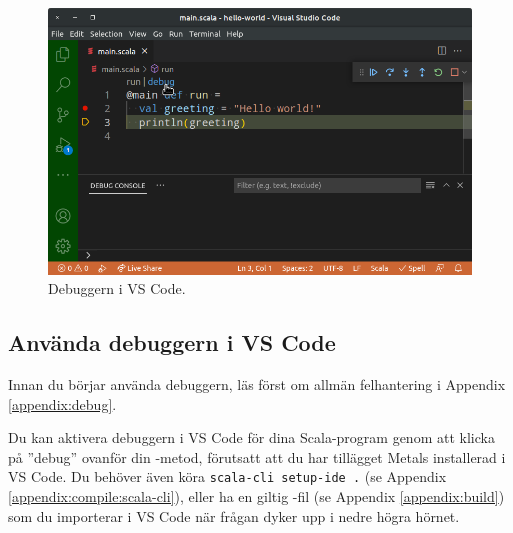 \begin{figure}
\centering
\includegraphics[width=1.0\textwidth]{../img/vscode-debug}
\caption{Debuggern i VS Code.\label{appendix-ide:vscode-debug}}
\end{figure}

\subsection{Använda debuggern i VS Code}

Innan du börjar använda debuggern, läs först om allmän felhantering i Appendix \ref{appendix:debug}.

Du kan aktivera debuggern i VS Code för dina Scala-program genom att klicka på ''debug'' ovanför din -metod, förutsatt att du har tillägget Metals installerad i VS Code. Du behöver även köra \texttt{scala-cli setup-ide .} (se Appendix \ref{appendix:compile:scala-cli}), eller ha en giltig -fil (se Appendix \ref{appendix:build}) som du importerar i VS Code när frågan dyker upp i nedre högra hörnet. 

